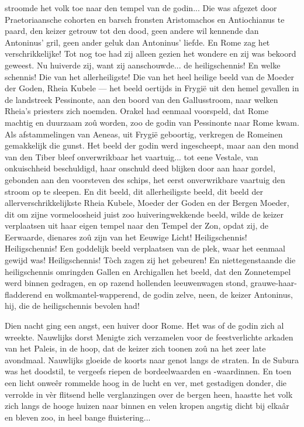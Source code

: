 \documentclass[a4paper, 12pt, oneside, dutch]{article}
\begin{document}
stroomde het volk toe naar den tempel van de godin... Die was afgezet door Praetoriaansche cohorten en barsch fronsten Aristomachos en Antiochianus te paard, den keizer getrouw tot den dood, geen andere wil kennende dan Antoninus' gril, geen ander geluk dan Antoninus' liefde. En Rome zag het verschrikkelijke! Tot nog toe had zij alleen gezien het wondere en zij was bekoord geweest. Nu huiverde zij, want zij aanschouwde... de heiligschennis! En welke schennis! Die van het allerheiligste! Die van het heel heilige beeld van de Moeder der Goden, Rheia Kubele --- het beeld oertijds in Frygië uit den hemel gevallen in de landstreek Pessinonte, aan den boord van den Gallusstroom, naar welken Rheia's priesters zich noemden. Orakel had eenmaal voorspeld, dat Rome machtig en duurzaam zoû worden, zoo de godin van Pessinonte naar Rome kwam. Als afstammelingen van Aeneas, uit Frygië geboortig, verkregen de Romeinen gemakkelijk die gunst. Het beeld der godin werd ingescheept, maar aan den mond van den Tiber bleef onverwrikbaar het vaartuig... tot eene Vestale, van onkuischheid beschuldigd, haar onschuld deed blijken door aan haar gordel, gebonden aan den voorsteven des schips, het eerst onverwrikbare vaartuig den stroom op te sleepen. En dit beeld, dit allerheiligste beeld, dit beeld der allerverschrikkelijkste Rheia Kubele, Moeder der Goden en der Bergen Moeder, dit om zijne vormeloosheid juist zoo huiveringwekkende beeld, wilde de keizer verplaatsen uit haar eigen tempel naar den Tempel der Zon, opdat zij, de Eerwaarde, dienares zoû zijn van het Eeuwige Licht! Heiligschennis! Heiligschennis! Een goddelijk beeld verplaatsen van de plek, waar het eenmaal gewijd was! Heiligschennis! Tòch zagen zij het gebeuren! En niettegenstaande die heiligschennis omringden Gallen en Archigallen het beeld, dat den Zonnetempel werd binnen gedragen, en op razend hollenden leeuwenwagen stond, grauwe-haar-fladderend en wolkmantel-wapperend, de godin zelve, neen, de keizer Antoninus, hij, die de heiligschennis bevolen had!

Dien nacht ging een angst, een huiver door Rome. Het was of de godin zich al wreekte. Nauwlijks dorst Menigte zich verzamelen voor de feestverlichte arkaden van het Paleis, in de hoop, dat de keizer zich toonen zoû na het zeer late avondmaal. Nauwlijks gloeide de koorts naar genot langs de straten. In de Subura was het doodstil, te vergeefs riepen de bordeelwaarden en -waardinnen. En toen een licht onweêr rommelde hoog in de lucht en ver, met gestadigen donder, die verrolde in vèr flitsend helle verglanzingen over de bergen heen, haastte het volk zich langs de hooge huizen naar binnen en velen kropen angstig dicht bij elkaâr en bleven zoo, in heel bange fluistering...
\end{document}
